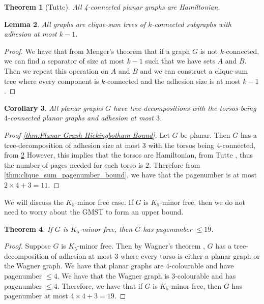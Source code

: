 \documentclass[]{report}
\newtheorem{theorem}{Theorem}
\newtheorem{corollary}[theorem]{Corollary}
\newtheorem{lemma}[theorem]{Lemma}
\theoremstyle{definition}
\numberwithin{theorem}{section}
\numberwithin{equation}{section}
\begin{document}
\begin{theorem}[Tutte\cite{tutteTheoremPlanarGraphs1956}]\label{thm:4-connected_planar_ham_cycle}
	All 4-connected planar graphs are Hamiltonian.
\end{theorem}

\begin{lemma}\label{lem:clique_sum_connected}
	All graphs are clique-sum trees of $k$-connected subgraphs with adhesion at most $k-1$.
\end{lemma}
\begin{proof}
	We have that from Menger's theorem that if a graph $G$ is not $k$-connected, we can find a separator of size at most $k-1$ such that we have sets $A$ and $B$. Then we repeat this operation on $A$ and $B$ and we can construct a clique-sum tree where every component is $k$-connected and the adhesion size is at most $k-1$. 
\end{proof}

\begin{corollary}\label{corr:planar_graphs_4_connected_cliqesums}
	All planar graphs $G$ have tree-decompositions with the torsos being $4$-connected planar graphs and adhesion at most $3$.
\end{corollary}


\begin{proof}[Proof \cref{thm:Planar Graph Hickingbotham Bound}]
	Let $G$ be planar. Then $G$ has a tree-decomposition of adhesion size at most $3$ with the torsos being $4$-connected, from \cref{lem:clique_sum_connected} However, this implies that the torsos are Hamiltonian, from Tutte \cite{tutteTheoremPlanarGraphs1956}, thus the number of pages needed for each torso is $2$. Therefore from \cref{thm:clique_sum_pagenumber_bound}, we have that the pagenumber is at most $2 \times 4 + 3 = 11$. 
\end{proof}

We will discuss the $K_5$-minor free case. If $G$ is $K_5$-minor free, then we do not need to worry about the GMST to form an upper bound. 
\begin{theorem}
	If $G$ is $K_5$-minor free, then $G$ has pagenumber $\leq 19$.
\end{theorem}

\begin{proof}
	Suppose $G$ is $K_5$-minor free. Then by Wagner's theorem \cite{wagnerUeberEigenschaftEbenen1937}, $G$ has a tree-decomposition of adhesion at most 3 where every torso is either a planar graph or the Wagner graph.
	We have that planar graphs are $4$-colourable and have pagenumber $\leq 4$. We have that the Wagner graph is $3$-colourable and has pagenumber $\leq 4$. Therefore, we have that if $G$ is $K_5$-minor free, then $G$ has pagenumber at most $4 \times 4 + 3 = 19$. 
\end{proof}
\end{document}
